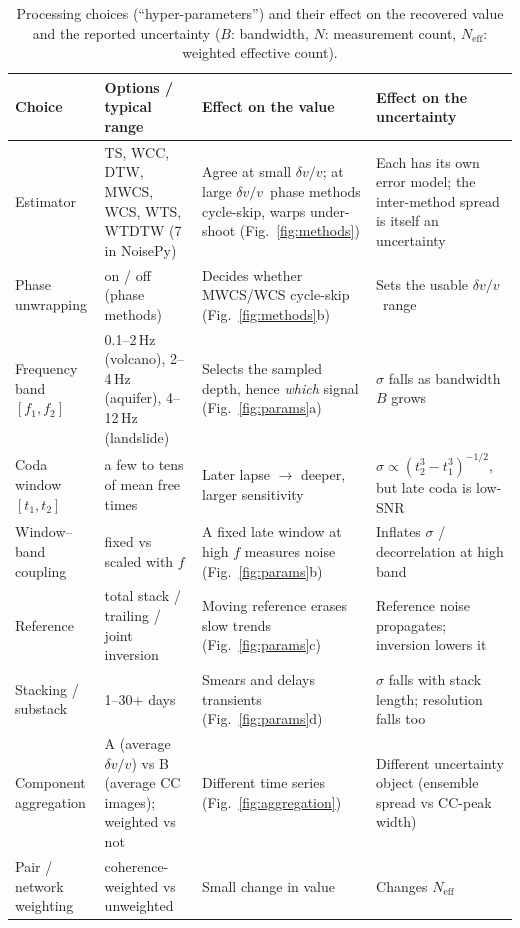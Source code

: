 \documentclass[
  referee]{gji}
\providecommand{\dvv}{\ensuremath{\delta v/v}}
\begin{document}
\begin{table}
\footnotesize
\caption{Processing choices (``hyper-parameters'') and their effect on the
recovered value and the reported uncertainty ($B$: bandwidth, $N$: measurement
count, $N_{\mathrm{eff}}$: weighted effective count).}
\label{tab:hyperparams}
\begin{tabularx}{\textwidth}{@{}>{\raggedright\arraybackslash}p{2.35cm} L L L@{}}
\toprule
\textbf{Choice} & \textbf{Options / typical range} & \textbf{Effect on the
value} & \textbf{Effect on the uncertainty} \\
\midrule
Estimator & TS, WCC, DTW, MWCS, WCS, WTS, WTDTW (7 in NoisePy) &
Agree at small \dvv; at large \dvv\ phase methods cycle-skip, warps under-shoot
(Fig.~\ref{fig:methods}) & Each has its own error model; the inter-method spread
is itself an uncertainty \\ \hline
Phase unwrapping & on / off (phase methods) & Decides whether MWCS/WCS cycle-skip
(Fig.~\ref{fig:methods}b) & Sets the usable \dvv\ range \\ \hline
Frequency band $[f_1,f_2]$ & 0.1--2\,Hz (volcano), 2--4\,Hz (aquifer),
4--12\,Hz (landslide) & Selects the sampled depth, hence \emph{which} signal
(Fig.~\ref{fig:params}a) & $\sigma$ falls as bandwidth $B$ grows \\ \hline
Coda window $[t_1,t_2]$ & a few to tens of mean free times & Later lapse $\to$
deeper, larger sensitivity & $\sigma\propto(t_2^3-t_1^3)^{-1/2}$, but late coda
is low-SNR \\ \hline
Window--band coupling & fixed vs scaled with $f$ & A fixed late window at high
$f$ measures noise (Fig.~\ref{fig:params}b) & Inflates $\sigma$ / decorrelation
at high band \\ \hline
Reference & total stack / trailing / joint inversion & Moving reference erases
slow trends (Fig.~\ref{fig:params}c) & Reference noise propagates; inversion
lowers it \\ \hline
Stacking / substack & 1--30+ days & Smears and delays transients
(Fig.~\ref{fig:params}d) & $\sigma$ falls with stack length; resolution falls
too \\ \hline
Component aggregation & A (average \dvv) vs B (average CC images); weighted vs
not & Different time series (Fig.~\ref{fig:aggregation}) & Different uncertainty
object (ensemble spread vs CC-peak width) \\ \hline
Pair / network weighting & coherence-weighted vs unweighted & Small change in
value & Changes $N_{\mathrm{eff}}$ \\ \hline

\end{tabularx}
\end{table}
\end{document}
